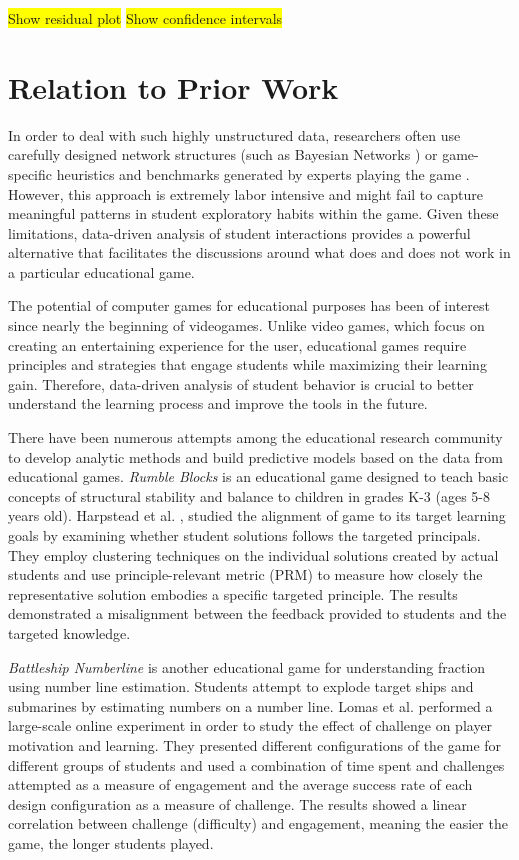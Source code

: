 \documentclass{sigchi}
\newcommand{\hl}[1]{\colorbox{yellow}{#1}}
\begin{document}
\hl{Show residual plot}
\hl{Show confidence intervals}

\section{Relation to Prior Work}
In order to deal with such highly unstructured data, researchers often use carefully designed network structures (such as Bayesian Networks \cite{albrecht1998bayesian}) or game-specific heuristics and benchmarks generated by experts playing the game \cite{mandel2014offline,tastan2011learning}. However, this approach is extremely labor intensive and might fail to capture meaningful patterns in student exploratory habits within the game. Given these limitations, data-driven analysis of student interactions provides a powerful alternative that facilitates the discussions around what does and does not work in a particular educational game.

The potential of computer games for educational purposes has been of interest since nearly the beginning of videogames. Unlike video games, which focus on creating an entertaining experience for the user, educational games require principles and strategies that engage students while maximizing their learning gain. Therefore, data-driven analysis of student behavior is crucial to better understand the learning process and improve the tools in the future.

There have been numerous attempts among the educational research community to develop analytic methods and build predictive models based on the data from educational games. \textit {Rumble Blocks}  is an educational game designed to teach basic concepts of structural stability and balance to children in grades K-3 (ages 5-8 years old). Harpstead et al. \cite{harpstead2014using}, studied the alignment of game to its target learning goals by examining whether student solutions follows the targeted principals. They employ clustering techniques on the individual solutions created by actual students and use principle-relevant metric (PRM) to measure how closely the representative solution embodies a specific targeted principle. The results demonstrated a misalignment between the feedback provided to students and the targeted knowledge.

\textit {Battleship Numberline} is another educational game for understanding fraction using number line estimation. Students attempt to explode target ships and submarines by estimating numbers on a number line. Lomas et al. \cite{lomas2013optimizing} performed a large-scale online experiment in order to study the effect of challenge on player motivation and learning. They presented different configurations of the game for different groups of students and used a combination of time spent and challenges attempted as a measure of engagement and the average success rate of each design configuration as a measure of challenge. The results showed a linear correlation between challenge (difficulty) and engagement, meaning the easier the game, the longer students played.
\end{document}
